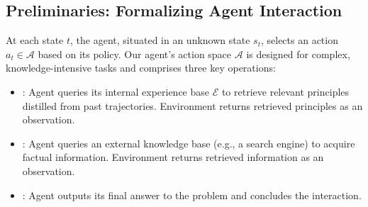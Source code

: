 \subsection{Preliminaries: Formalizing Agent Interaction}

At each state $t$, the agent, situated in an unknown state $s_t$, selects an action $a_t \in \mathcal{A}$ based on its policy. Our agent's action space $\mathcal{A}$ is designed for complex, knowledge-intensive tasks and comprises three key operations:

\begin{itemize}[leftmargin=2em]
    
    \item {}: Agent queries its internal experience base $\mathcal{E}$ to retrieve relevant principles distilled from past trajectories. Environment returns retrieved principles as an observation.
    
    \item {}: Agent queries an external knowledge base (e.g., a search engine) to acquire factual information. Environment returns retrieved information as an observation.
    \item {}: Agent outputs its final answer to the problem and concludes the interaction. 
 
\end{itemize}









